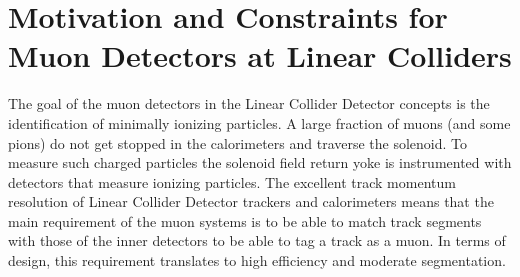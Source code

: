 \section{Motivation and Constraints for Muon Detectors at Linear Colliders}

The goal of the muon detectors in the Linear Collider Detector concepts is the identification of minimally ionizing particles. A large fraction of muons (and some pions) do not get stopped in the calorimeters and traverse the solenoid. To measure such charged particles the solenoid field return yoke is instrumented with detectors that measure ionizing particles. The excellent track momentum resolution of Linear Collider Detector trackers and calorimeters means that the main requirement of the muon systems is to be able to match track segments with those of the inner detectors to be able to tag a track as a muon. In terms of design, this requirement translates to high efficiency and moderate segmentation.
